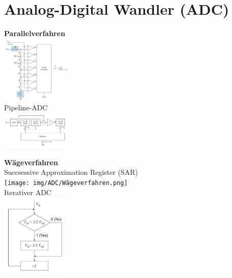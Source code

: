 \documentclass[margin=normal]{tex/hsrzf}
\begin{document}
\section{Analog-Digital Wandler (ADC)}
\begin{multicols}{3}
  \begin{minipage}{0.3\textwidth}
    \textbf{Parallelverfahren}
    \\\includegraphics[width=0.25\textwidth]{img/ADC/Parallel-Verfahren.png}
    \\Pipeline-ADC
    \\\includegraphics[width=0.25\textwidth]{img/ADC/Pipeline.png}
  \end{minipage}

  \begin{minipage}{0.3\textwidth}
    \textbf{Wägeverfahren}
    \\Succsessive Approximation Register (SAR)
    \\\texttt{[image: img/ADC/Wägeverfahren.png]}
    \\Iterativer ADC
    \\\includegraphics[width=0.25\textwidth]{img/ADC/IterativerADC.png}
  \end{minipage}


\end{multicols}
\end{document}

